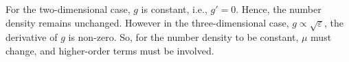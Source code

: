 \documentclass[a4paper,11pt]{article}
\begin{document}
For the two-dimensional case, $g$ is constant, i.e., $g'=0$. Hence, the number density remains unchanged. However in the three-dimensional case, $g\propto\sqrt{\varepsilon}$, the derivative of $g$ is non-zero. So, for the number density to be constant, $\mu$ must change, and higher-order terms must be involved.




\end{document}
